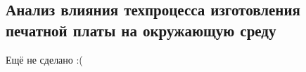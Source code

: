 \newpage

\subsection{Анализ влияния техпроцесса изготовления печатной платы на окружающую среду}

Ещё не сделано :(
